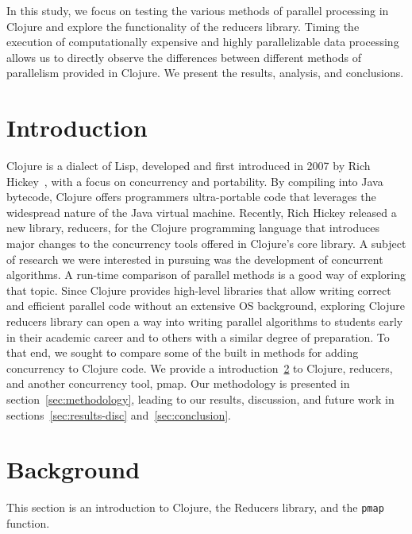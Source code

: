 \documentclass[12pt]{article}
\newcommand{\comment}[1]{{\bf \tt  {#1}}}
\newcommand{\emcomment}[1]{\textcolor{ForestGreen}{\comment{Elena: {#1}}}}
\newcommand{\clocode}[1]{{\texttt {#1}}}
\begin{document}
In this study, we focus on testing the various methods of parallel processing in Clojure and explore the functionality of the reducers library. Timing the execution of computationally expensive and highly parallelizable data processing allows us to directly observe the differences between different methods of parallelism provided in Clojure. We present the results, analysis, and conclusions.


 \newpage

\setcounter{page}{1}


\section{Introduction}\label{sec:intro}
	 Clojure is a dialect of Lisp, developed and first introduced in 2007 by Rich Hickey~\cite{Hickey:2008}, with a focus on concurrency and portability. By compiling into Java bytecode, Clojure offers programmers ultra-portable code that leverages the widespread nature of the Java virtual machine. Recently, Rich Hickey released a new library, reducers, for the Clojure programming language that introduces major changes to the concurrency tools offered in Clojure's core library. A subject of research we were interested in pursuing was the development of concurrent algorithms. A run-time comparison of parallel methods is a good way of exploring that topic. Since Clojure provides high-level libraries that allow writing correct and efficient parallel code without an extensive OS background, exploring Clojure reducers library can open a way into writing parallel algorithms to students early in their academic career and to others with a similar degree of preparation. 
To that end, we sought to compare some of the built in methods for adding concurrency to Clojure code. We provide a introduction~\ref{sec:background} to Clojure, reducers, and another concurrency tool, pmap. Our methodology is presented in section~\ref{sec:methodology}, leading to our results, discussion, and future work in sections~\ref{sec:results-disc} and~\ref{sec:conclusion}.



\section{Background}\label{sec:background}
This section is an introduction to Clojure, the Reducers library, and the \clocode{pmap} function. 
\end{document}
